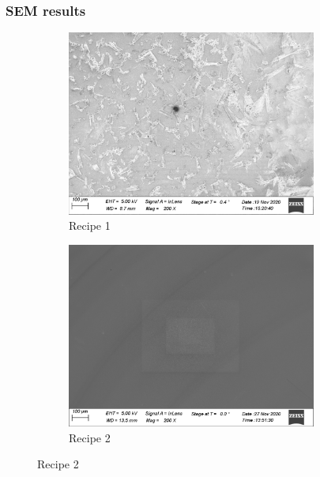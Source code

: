 \documentclass{beamer}
\begin{document}
\begin{frame}
	\frametitle{SEM results }
	\begin{figure}
		\begin{subfigure}{.49\textwidth}
		\centering
			\includegraphics[width=0.9\textwidth]{Images/r1_sem_200.png}
			\caption{Recipe 1}
		\end{subfigure}
		\begin{subfigure}{.49\textwidth}
		\centering
			\includegraphics[width=0.9\textwidth]{Images/r2_sem_200.png}
			\caption{Recipe 2}
		\end{subfigure}
	\end{figure}

\end{frame}
\end{document}
